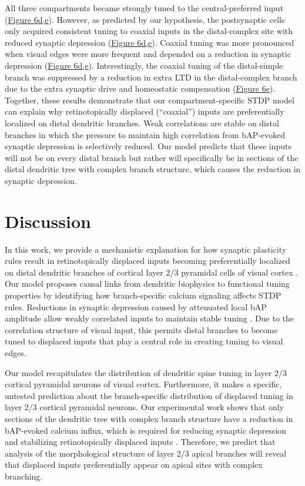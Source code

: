 \documentclass[twocolumn]{theme/bioRxiv}
\begin{document}
All three compartments became strongly tuned to the central-preferred input (\hyperref[fig:6]{Figure 6d,e}). However, as predicted by our hypothesis, the postsynaptic cells only acquired consistent tuning to coaxial inputs in the distal-complex site with reduced synaptic depression (\hyperref[fig:6]{Figure 6d,e}). Coaxial tuning was more pronounced when visual edges were more frequent and depended on a reduction in synaptic depression (\hyperref[fig:6]{Figure 6d,e}). Interestingly, the coaxial tuning of the distal-simple branch was suppressed by a reduction in extra LTD in the distal-complex branch due to the extra synaptic drive and homeostatic compensation (\hyperref[fig:6]{Figure 6e}). Together, these results demonstrate that our compartment-specific STDP model can explain why retinotopically displaced (“coaxial”) inputs are preferentially localized on distal dendritic branches. Weak correlations are stable on distal branches in which the pressure to maintain high correlation from bAP-evoked synaptic depression is selectively reduced. Our model predicts that these inputs will not be on every distal branch but rather will specifically be in sections of the distal dendritic tree with complex branch structure, which causes the reduction in synaptic depression.

\section*{Discussion}\label{s:discussion}

In this work, we provide a mechanistic explanation for how synaptic plasticity rules result in retinotopically displaced inputs becoming preferentially localized on distal dendritic branches of cortical layer 2/3 pyramidal cells of visual cortex \citep{iacarusoSynapticOrganizationVisual2017}. Our model proposes causal links from dendritic biophysics to functional tuning properties by identifying how branch-specific calcium signaling affects STDP rules. Reductions in synaptic depression caused by attenuated local bAP amplitude allow weakly correlated inputs to maintain stable tuning \citep{landauDendriticBranchStructure2022}. Due to the correlation structure of visual input, this permits distal branches to become tuned to displaced inputs that play a central role in creating tuning to visual edges. 

Our model recapitulates the distribution of dendritic spine tuning in layer 2/3 cortical pyramidal neurons of visual cortex. Furthermore, it makes a specific, untested prediction about the branch-specific distribution of displaced tuning in layer 2/3 cortical pyramidal neurons. Our experimental work shows that only sections of the dendritic tree with complex branch structure have a reduction in bAP-evoked calcium influx, which is required for reducing synaptic depression and stabilizing retinotopically displaced inputs \citep{landauDendriticBranchStructure2022}. Therefore, we predict that analysis of the morphological structure of layer 2/3 apical branches will reveal that displaced inputs preferentially appear on apical sites with complex branching. 
\end{document}
